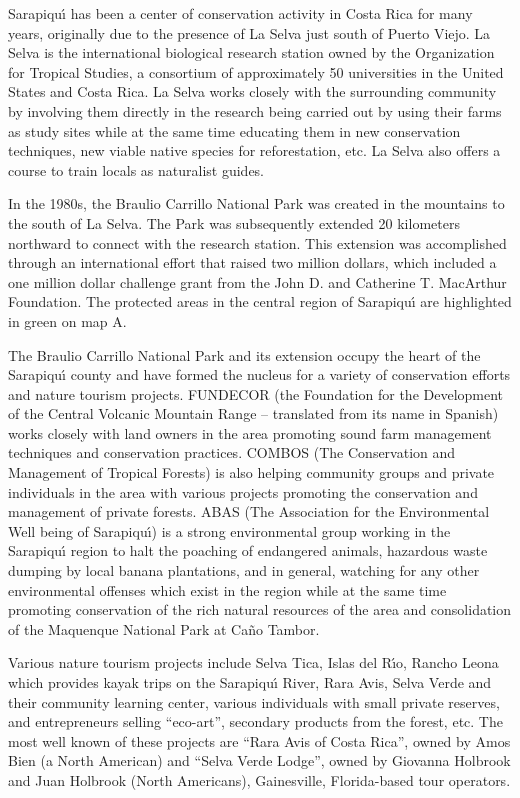 Sarapiqu\'{\i} has been a center of conservation activity in Costa Rica
for many years, originally due to the presence of La Selva just
south of Puerto Viejo.  La Selva is the international biological
research station owned by the Organization for Tropical Studies, a
consortium of approximately 50 universities in the United States
and Costa Rica.  La Selva works closely with the surrounding
community by involving them directly in the research being carried
out by using their farms as study sites while at the same time
educating them in new conservation techniques, new viable native
species for reforestation, etc.  La Selva also offers a course to
train locals as naturalist guides.

In the 1980s, the Braulio Carrillo National Park was created in the
mountains to the south of La Selva.  The Park was subsequently
extended 20 kilometers northward to connect with the research
station.  This extension was accomplished through an international
effort that raised two million dollars, which included a one
million dollar challenge grant from the John D. and Catherine T.
MacArthur Foundation.  The protected areas in the central region
of Sarapiqu\'{\i} are highlighted in green on map A.

The Braulio Carrillo National Park and its extension occupy the
heart of the Sarapiqu\'{\i} county and have formed the nucleus for a
variety of conservation efforts and nature tourism projects.  FUNDECOR
(the Foundation for the Development of the Central Volcanic
Mountain Range -- translated from its name in Spanish) works closely
with land owners in the area promoting sound farm management
techniques and conservation practices.  COMBOS (The Conservation and
Management of Tropical Forests) is also helping community groups
and private individuals in the area with various projects promoting
the conservation and management of private forests.  ABAS (The
Association for the Environmental Well being of Sarapiqu\'{\i}) is a
strong environmental group working in the Sarapiqu\'{\i} region to halt
the poaching of endangered animals, hazardous waste dumping by
local banana plantations, and in general, watching for any other
environmental offenses which exist in the region while at the same
time promoting conservation of the rich natural resources of the
area and consolidation of the Maquenque National Park at Ca\~{n}o
Tambor.

Various nature tourism projects include Selva Tica, Islas del R\'{\i}o,
Rancho Leona which provides kayak trips on the Sarapiqu\'{\i} River,
Rara Avis, Selva Verde and their community learning center, various
individuals with small private reserves, and entrepreneurs selling
``eco-art'', secondary products from the forest, etc.  The most well
known of these projects are ``Rara Avis of Costa Rica'', owned by Amos
Bien (a North American) and ``Selva Verde Lodge'', owned by Giovanna
Holbrook and Juan Holbrook (North Americans), Gainesville, Florida-based
tour operators.

